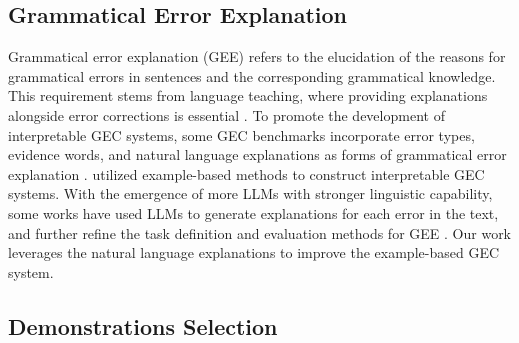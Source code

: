 \subsection{Grammatical Error Explanation}





Grammatical error explanation (GEE) refers to the elucidation of the reasons for grammatical errors in sentences and the corresponding grammatical knowledge. This requirement stems from language teaching, where providing explanations alongside error corrections is essential \cite{liang-etal-2023-chatback}. To promote the development of interpretable GEC systems, some GEC benchmarks incorporate error types, evidence words, and natural language explanations as forms of grammatical error explanation \cite{fei-etal-2023-enhancing, ye2024excgec}. \citet{kaneko-etal-2022-interpretability} utilized example-based methods to construct interpretable GEC systems. With the emergence of more LLMs with stronger linguistic capability, some works have used LLMs to generate explanations for each error in the text, and further refine the task definition and evaluation methods for GEE \cite{kaneko-okazaki-2024-controlled, song-etal-2024-gee}. Our work leverages the natural language explanations to improve the example-based GEC system.


\subsection{Demonstrations Selection}






